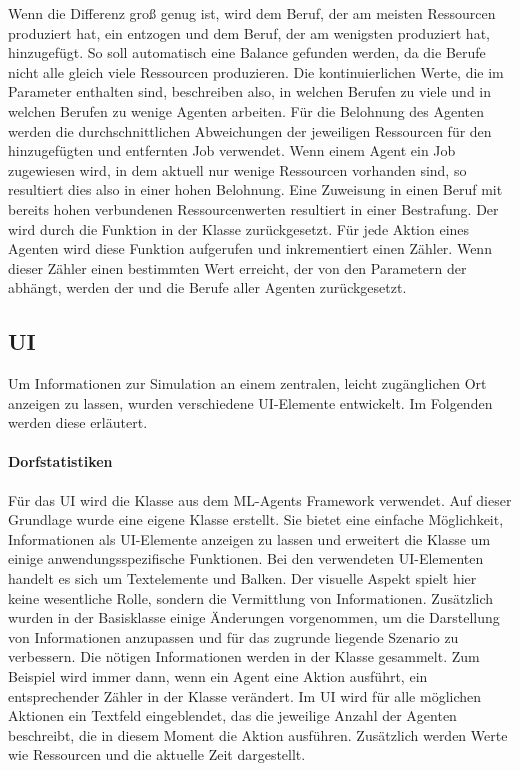 Wenn die Differenz groß genug ist, wird dem Beruf, der am meisten Ressourcen produziert hat, ein  entzogen und dem Beruf, der am wenigsten produziert hat, hinzugefügt. So soll automatisch eine Balance gefunden werden, da die Berufe nicht alle gleich viele Ressourcen produzieren. Die kontinuierlichen Werte, die im Parameter  enthalten sind, beschreiben also, in welchen Berufen zu viele und in welchen Berufen zu wenige Agenten arbeiten.
Für die Belohnung des Agenten werden die durchschnittlichen Abweichungen der jeweiligen Ressourcen für den hinzugefügten und entfernten Job verwendet. Wenn einem Agent ein Job zugewiesen wird, in dem aktuell nur wenige Ressourcen vorhanden sind, so resultiert dies also in einer hohen Belohnung. Eine Zuweisung in einen Beruf mit bereits hohen verbundenen Ressourcenwerten resultiert in einer Bestrafung.
Der  wird durch die Funktion  in der Klasse  zurückgesetzt. Für jede Aktion eines Agenten wird diese Funktion aufgerufen und inkrementiert einen Zähler. Wenn dieser Zähler einen bestimmten Wert erreicht, der von den Parametern der  abhängt, werden der  und die Berufe aller Agenten zurückgesetzt. 







\subsection{UI}
Um Informationen zur Simulation an einem zentralen, leicht zugänglichen Ort anzeigen zu lassen, wurden verschiedene UI-Elemente entwickelt. Im Folgenden werden diese erläutert.

\paragraph{Dorfstatistiken}
Für das UI wird die Klasse  aus dem ML-Agents Framework verwendet. Auf dieser Grundlage wurde eine eigene Klasse  erstellt. Sie bietet eine einfache Möglichkeit, Informationen als UI-Elemente anzeigen zu lassen und erweitert die Klasse  um einige anwendungsspezifische Funktionen. Bei den verwendeten UI-Elementen handelt es sich um Textelemente und Balken. Der visuelle Aspekt spielt hier keine wesentliche Rolle, sondern die Vermittlung von Informationen. Zusätzlich wurden in der Basisklasse  einige Änderungen vorgenommen, um die Darstellung von Informationen anzupassen und für das zugrunde liegende Szenario zu verbessern.
Die nötigen Informationen werden in der Klasse  gesammelt. Zum Beispiel wird immer dann, wenn ein Agent eine Aktion ausführt, ein entsprechender Zähler in der Klasse verändert. Im UI wird für alle möglichen Aktionen ein Textfeld eingeblendet, das die jeweilige Anzahl der Agenten beschreibt, die in diesem Moment die Aktion ausführen. Zusätzlich werden Werte wie Ressourcen und die aktuelle Zeit dargestellt.


